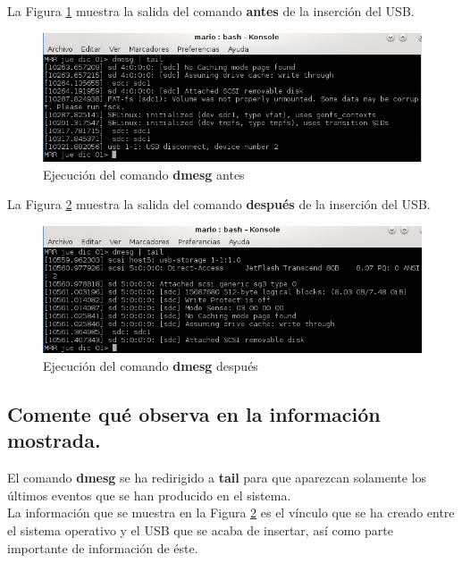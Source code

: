 La Figura \ref{fig:figura4} muestra la salida del comando \textbf{antes} de la inserción del USB.

\begin{figure}[H] %
	\centering
	\includegraphics[scale=0.8]{figuras/figura4.png} 
	\caption{Ejecución del comando \textbf{dmesg} antes} 
	\label{fig:figura4}
\end{figure}

La Figura \ref{fig:figura5} muestra la salida del comando \textbf{después} de la inserción del USB.

\begin{figure}[H] %
	\centering
	\includegraphics[scale=0.8]{figuras/figura5.png} 
	\caption{Ejecución del comando \textbf{dmesg} después} 
	\label{fig:figura5}
\end{figure}

\subsection{Comente qué observa en la información
	mostrada.}

El comando \textbf{dmesg} se ha redirigido a \textbf{tail} para que aparezcan solamente los últimos eventos que se han producido en el sistema.
\\

La información que se muestra en la Figura \ref{fig:figura5} es el vínculo que se ha creado entre el sistema operativo y el USB que se acaba de insertar, así como parte importante de información de éste.
\\

